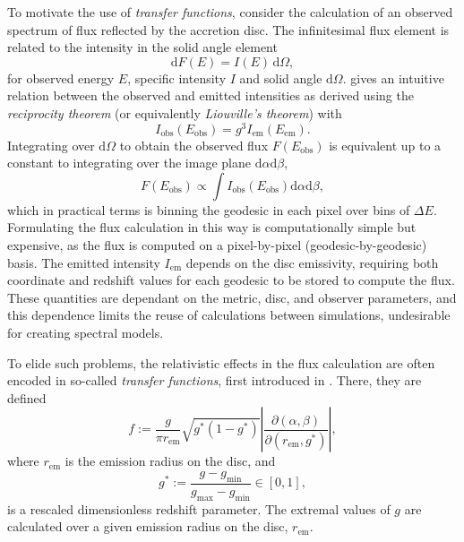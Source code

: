 \documentclass[fleqn,usenatbib]{mnras}
\renewcommand{\d}{\text{d}}
\newcommand{\jacobian}[2]{\left\lvert \frac{\partial #1}{\partial #2} \right\rvert}
\begin{document}
To motivate the use of \emph{transfer functions}, consider the calculation of an
observed spectrum of flux reflected by the accretion disc. The infinitesimal
flux element is related to the intensity in the solid angle element
\begin{equation}
\label{eq:infinitesimal-flux}
\d F(E) = I(E)\, \d \Omega,
\end{equation}
for observed energy $E$, specific intensity $I$ and solid angle $\d \Omega$.
\cite{ingram_public_2019} gives an intuitive relation between the observed
and emitted intensities as derived using the \emph{reciprocity theorem} (or
equivalently \emph{Liouville's theorem}) with
\begin{equation}
\label{eq:liouville-theorem}
I_\text{obs}\left( E_\text{obs}\right) = g^3 I_\text{em}\left(E_\text{em}\right).
\end{equation}
Integrating over $\d \Omega$ to obtain the observed flux $F(E_\text{obs})$ is
equivalent up to a constant to integrating over the image plane $\d \alpha \d
\beta$,
\begin{equation}
\label{eq:integrate-impact-params}
F(E_\text{obs}) \propto \int I_\text{obs}(E_\text{obs}) \d \alpha \d \beta,
\end{equation}
which in practical terms is binning the geodesic in each pixel over bins of
$\Delta E$.  Formulating the flux calculation in this way is computationally
simple but expensive, as the flux is computed on a pixel-by-pixel
(geodesic-by-geodesic) basis. The emitted intensity $I_\text{em}$ depends on the
disc emissivity, requiring both coordinate and redshift values for each geodesic
to be stored to compute the flux. These quantities are dependant on the metric,
disc, and observer parameters, and this dependence limits the reuse of
calculations between simulations, undesirable for creating spectral models.

To elide such problems, the relativistic effects in the flux calculation are
often encoded in so-called \emph{transfer functions}, first introduced in
\cite{cunningham_effects_1975}. There, they are defined
\begin{equation}
    \label{eq:cunn-transfer-function}
    f:=\frac{g}{\pi r_\text{em}} \sqrt{g^\ast(1 - g^\ast)} \jacobian{(\alpha, \beta)}{(r_\text{em}, g^\ast)},
\end{equation}
where $r_\text{em}$ is the emission radius on the disc, and
\begin{equation}
    g^\ast := \frac{g - g_\text{min}}{g_\text{max} - g_\text{min}} \in [0, 1],
\end{equation}
is a rescaled dimensionless redshift parameter. The extremal values of $g$ are
calculated over a given emission radius on the disc, $r_\text{em}$.
\end{document}
